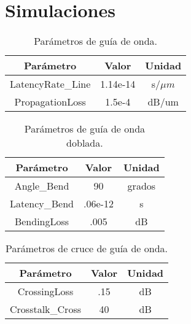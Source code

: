 \section{Simulaciones}

\begin{table}[H]
\centering
\begin{tabular}{|c|c|c|}
\hline
Parámetro & Valor & Unidad \\ 
\hline
LatencyRate\_Line & 1.14e-14 &s/$\mu m$ \\
PropagationLoss & 1.5e-4 & dB/um \\
\hline
\end{tabular}
\caption{Parámetros de guía de onda. \cite{xia2006ultracompact} \cite{gnan2008fabrication}}
\label{tb:phpar_wg}
\end{table} 

\begin{table}[H]
\centering
\begin{tabular}{|c|c|c|}
\hline
Parámetro & Valor & Unidad \\ 
\hline
Angle\_Bend & 90 & grados \\
Latency\_Bend & .06e-12 &s \\
BendingLoss & .005 & dB \\
\hline
\end{tabular}
\caption{Parámetros de guía de onda doblada. \cite{xia2006ultracompact}}
\label{tb:phpar_wgb}
\end{table} 

\begin{table}[H]
\centering
\begin{tabular}{|c|c|c|}
\hline
Parámetro & Valor & Unidad \\ 
\hline
CrossingLoss & .15   & dB\\
Crosstalk\_Cross & 40 &dB\\
\hline
\end{tabular}
\caption{Parámetros de cruce de guía de onda. \cite{bogaerts2007low}}
\label{tb:phpar_wgc}
\end{table} 



